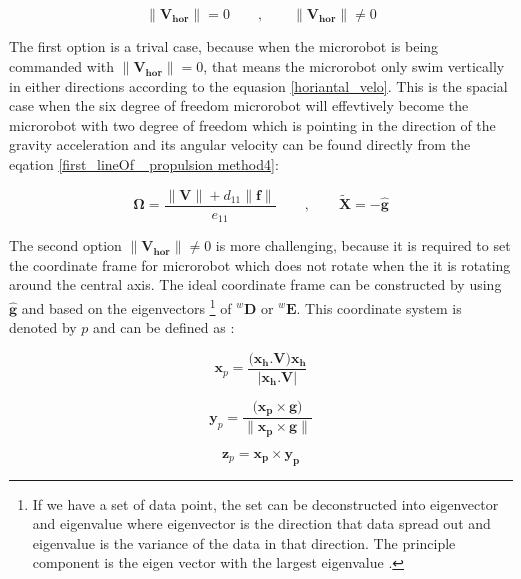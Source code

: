 \documentclass[12pt,a4paper,titlepage]{report}
\begin{document}
\begin{equation}
 {\| \bm {{V}_{hor}}\|}  = 0 \qquad ,  \qquad  {\| \bm{{V}_{hor}}\|} \neq 0
\label{total_force_torque}
\end{equation}

The first option is a trival case, because when the microrobot is being commanded with
$ {\| \bm {{V}_{hor}}\|}  = 0$, that means the microrobot only swim vertically in either 
directions according to the equasion \ref{horiantal_velo}. This is the spacial case when the six degree of
freedom microrobot will effevtively become the microrobot with two degree of freedom which is pointing
in the direction of the gravity acceleration and its angular velocity can be found directly from the eqation
\ref{first_lineOf_ propulsion method4}:


\begin{equation}
 \bm {\Omega}  = \frac{{\| \bm{V}\|}+ d_{11}\| \bm{f}\|}{e_{11}}  \qquad ,  \qquad  \tilde{\bm{X}} = -\hat{\bm{g}}
\label{angular_velo_horiVelo=0}
\end{equation}

The second option ${\| \bm{{V}_{hor}}\|} \neq 0$ is more challenging, because it is required to set 
the coordinate frame for microrobot which does not rotate when the it is rotating around the central axis.
The ideal coordinate frame can be constructed by using $\hat{\bm{g}}$ and based on the eigenvectors
\footnote{If we have a set of data point, the set can be deconstructed into eigenvector and eigenvalue
where eigenvector is the direction that data spread out and eigenvalue is the variance of the data in that
direction. The principle component is the eigen vector with the largest eigenvalue \citep{Doe:2013Oct:Online}.} of 
$^{w}\bm{D}$ or $^{w}\bm{E}$. This coordinate system is denoted by $p$ and can be defined as :


\begin{equation}
 \bm{x}_p = \frac{(\bm{{x}_h . V )x_h}}{|\bm{x_h .V}|}
\label{x_pAxis}
\end{equation}



\begin{equation}
 \bm{y}_p = \frac{(\bm{{x}_p \times g)}}{\| \bm{x_p \times g}\|} 
\label{y_pAxis}
\end{equation}


\begin{equation}
 \bm{z}_p = \bm{{x}_p \times {y}_p}
\label{z_pAxis}
\end{equation}
\end{document}
